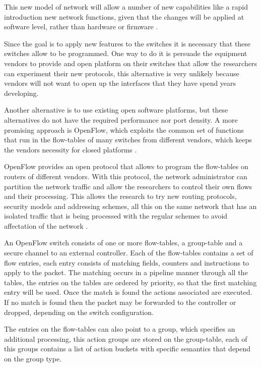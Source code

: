 This new model of network will allow a number of new capabilities like a rapid introduction new network functions, given that the changes will be applied at software level, rather than hardware or firmware \cite{li2013software}. 

Since the goal is to apply new features to the switches it is necessary that these switches allow to be programmed. One way to do it is persuade the equipment vendors to provide and open platform on their switches that allow the researchers can experiment their new protocols, this alternative is very unlikely because vendors will not want to open up the interfaces that they have spend years developing.

Another alternative is to use existing open software platforms, but these alternatives do not have the required performance nor port density. A more promising approach is OpenFlow, which exploits the common set of functions that run in the flow-tables of many switches from different vendors, which keeps the vendors necessity for closed platforms \cite{mckeown2008openflow}.

OpenFlow provides an open protocol that allows to program the flow-tables on routers of different vendors. With this protocol, the network administrator can partition the network traffic and allow the researchers to control their own flows and their processing. This allows the research to try new routing protocols, security models and addressing schemes, all this on the same network that has an isolated traffic that is being processed with the regular schemes to avoid affectation of the network \cite{mckeown2008openflow}.

An OpenFlow switch consists of one or more flow-tables, a group-table and a secure channel to an external controller. Each of the flow-tables contains a set of flow entries, each entry consists of matching fields, counters and instructions to apply to the packet. The matching occurs in a pipeline manner through all the tables, the entries on the tables are ordered by priority, so that the first matching entry will be used. Once the match is found the actions associated are executed. If no match is found then the packet may be forwarded to the controller or dropped, depending on the switch configuration.

The entries on the flow-tables can also point to a group, which specifies an additional processing, this action groups are stored on the group-table, each of this groups contains a list of action buckets with specific semantics that depend on the group type. 

